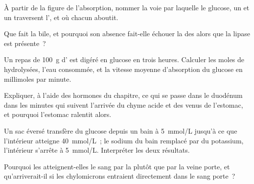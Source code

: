 \begin{exercise}[$\star$]\label{exo:b1:digestion-absorption:3}
À partir de la figure de l'absorption, nommer la voie par laquelle le
glucose, un  et un  traversent l', et où
chacun aboutit.
\end{exercise}

\begin{exercise}[$\star$]\label{exo:b1:digestion-absorption:4}
Que fait la bile, et pourquoi son absence fait-elle échouer la
 des  alors que la lipase est présente~?
\end{exercise}

\begin{exercise}[$\star\star$]\label{exo:b1:digestion-absorption:5}
Un repas de \qty{100}{g} d' est digéré en glucose en trois
heures. Calculer les moles de  hydrolysées, l'eau
consommée, et la vitesse moyenne d'absorption du glucose en millimoles
par minute.
\end{exercise}

\begin{exercise}[$\star\star$]\label{exo:b1:digestion-absorption:6}
Expliquer, à l'aide des hormones du chapitre, ce qui se passe dans le
duodénum dans les minutes qui suivent l'arrivée du chyme acide et des
 venus de l'estomac, et pourquoi l'estomac ralentit alors.
\end{exercise}

\begin{exercise}[$\star\star$]\label{exo:b1:digestion-absorption:7}
Un sac éversé transfère du glucose depuis un bain à \qty{5}{mmol/L}
jusqu'à ce que l'intérieur atteigne \qty{40}{mmol/L}~; le sodium du bain
remplacé par du potassium, l'intérieur s'arrête à \qty{5}{mmol/L}.
Interpréter les deux résultats.
\end{exercise}

\begin{exercise}[$\star\star$]\label{exo:b1:digestion-absorption:8}
Pourquoi les  atteignent-elles le sang par la  plutôt que
par la veine porte, et qu'arriverait-il si les chylomicrons entraient
directement dans le sang porte~?
\end{exercise}

